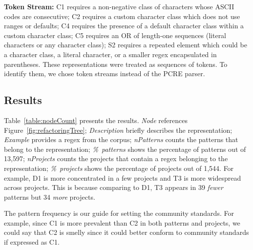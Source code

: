 \textbf{Token Stream:}
C1 requires a non-negative class of characters whose ASCII codes are consecutive;
C2 requires a custom character class which does not use ranges or defaults;
C4 requires the presence of a default character class within a custom character class;
C5 requires an OR of length-one sequences (literal characters or any character class);
S2 requires a repeated element which could be a character class, a literal character, or a smaller regex encapsulated in parentheses. These representations were treated as sequences of tokens. To identify them, we chose token streams instead of the PCRE parser.

\subsection{Results}
Table~\ref{table:nodeCount} presents the results. 
\emph{Node} references Figure~\ref{fig:refactoringTree}; \emph{Description} briefly describes the representation; \emph{Example} provides a regex from the corpus; \emph{nPatterns} counts the patterns that belong to the representation;
\emph{\%~patterns} shows the percentage of patterns out of 13,597; 
\emph{nProjects} counts the projects that contain a regex belonging to the representation; 
\emph{\%~projects} shows the percentage of projects out of 1,544.
For example, D1 is more concentrated in a few projects and T3 is more widespread across projects. This is because comparing to D1, T3 appears in 39 \emph{fewer} patterns but 34 \emph{more} projects.

The pattern frequency is our guide for setting the community standards.
For example, since C1 is more prevalent than C2 in both patterns and projects, we could say that C2 is smelly since it could better conform to community standards if expressed as C1.

